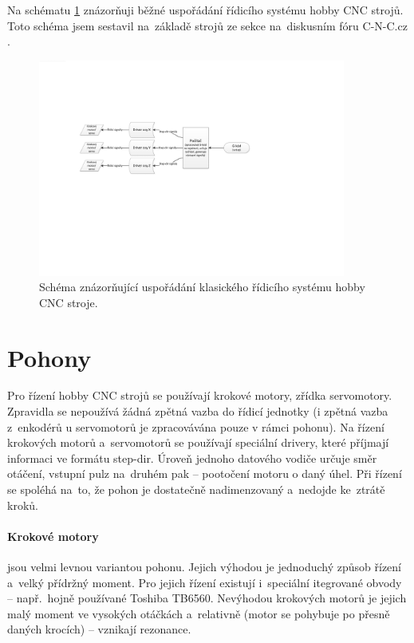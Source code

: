 	Na schématu \ref{nak:hobby} znázorňuji běžné uspořádání řídicího systému hobby CNC strojů. Toto schéma jsem sestavil na~základě strojů ze sekce  na~diskusním fóru C-N-C.cz \cite{c-n-c}.
	
	\begin{figure}[h]
		\centering
		\includegraphics[width=0.9\textwidth]{img/HobbyCNC.pdf}
		\caption{Schéma znázorňující uspořádání klasického řídicího systému hobby CNC stroje.}\label{nak:hobby}	
	\end{figure}
	
	\section{Pohony}
	Pro řízení hobby CNC strojů se používají krokové motory, zřídka servomotory. Zpravidla se nepoužívá žádná zpětná vazba do řídicí jednotky (i zpětná vazba z~enkodérů u servomotorů je zpracovávána pouze v rámci pohonu). Na řízení krokových motorů a~servomotorů se používají speciální drivery, které příjmají informaci ve formátu step-dir. Úroveň jednoho datového vodiče určuje směr otáčení, vstupní pulz na~druhém pak  -- pootočení motoru o daný úhel. Při řízení se spoléhá na~to, že pohon je dostatečně nadimenzovaný a~nedojde ke~ztrátě kroků.
	
	\paragraph{Krokové motory} jsou velmi levnou variantou pohonu. Jejich výhodou je jednoduchý způsob řízení a~velký přídržný moment. Pro jejich řízení existují i~speciální itegrované obvody -- např.~hojně používané Toshiba TB6560\cite{TB6560}. Nevýhodou krokových motorů je jejich malý moment ve vysokých otáčkách a~relativně  (motor se pohybuje po přesně daných krocích) -- vznikají rezonance\cite{krokovymotor}.
	

